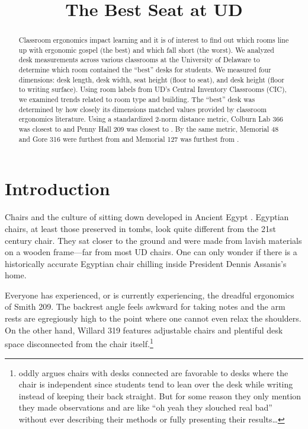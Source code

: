 \documentclass[conference]{IEEEtran}
\begin{document}
\title{The Best Seat at UD}

\author{
}
\maketitle
\begin{abstract}
Classroom ergonomics impact learning and it is of interest to find out which rooms line up with ergonomic gospel (the best) and which fall short (the worst). We analyzed desk measurements across various classrooms at the University of Delaware to determine which room contained the “best” desks for students. We measured four dimensions: desk length, desk width, seat height (floor to seat), and desk height (floor to writing surface). Using room labels from UD’s Central Inventory Classrooms (CIC), we examined trends related to room type and building. The “best” desk was determined by how closely its dimensions matched values provided by classroom ergonomics literature. Using a standardized 2-norm distance metric, Colburn Lab 366 was closest to \cite{mohamed} and Penny Hall 209 was closest to \cite{Ansari}. By the same metric, Memorial 48 and Gore 316 were furthest from \cite{mohamed} and Memorial 127 was furthest from \cite{Ansari}.\end{abstract}
\section{Introduction}

Chairs and the culture of sitting down developed in Ancient Egypt \cite{egypt}. Egyptian chairs, at least those preserved in tombs, look quite different from the 21st century chair. They sat closer to the ground and were made from lavish materials on a wooden frame---far from most UD chairs. One can only wonder if there is a historically accurate Egyptian chair chilling inside President Dennis Assanis’s home. 

Everyone has experienced, or is currently experiencing, the dreadful ergonomics of Smith 209. The backrest angle feels awkward for taking notes and the arm rests are egregiously high to the point where one cannot even relax the shoulders. On the other hand, Willard 319 features adjustable chairs and plentiful desk space disconnected from the chair itself.\footnote{oddly \cite{mohamed} argues chairs with desks connected are favorable to desks where the chair is independent since students tend to lean over the desk while writing instead of keeping their back straight. But for some reason they only mention they made observations and are like “oh yeah they slouched real bad” without ever describing their methods or fully presenting their results…}
\end{document}
